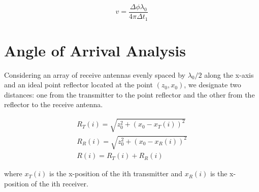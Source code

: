 \documentclass{IEEEtran}
\begin{document}
\begin{equation}
	v = \frac{\Delta \phi \lambda_0}{4\pi \Delta t_1}
\end{equation}

\section{Angle of Arrival Analysis}
Considering an array of receive antennas evenly spaced by $\lambda_0/2$ along the x-axis and an ideal point reflector located at the point $(z_0,x_0)$, we designate two distances: one from the transmitter to the point reflector and the other from the reflector to the receive antenna.

\begin{align}
    R_T(i) = \sqrt{z_0^2 + (x_0 - x_T(i))^2} \\
    R_R(i) = \sqrt{z_0^2 + (x_0 - x_R(i))^2} \\
    R(i) = R_T(i) + R_R(i)
\end{align}

where $x_T(i)$ is the x-position of the ith transmitter and $x_R(i)$ is the x-position of the ith receiver.
\end{document}
